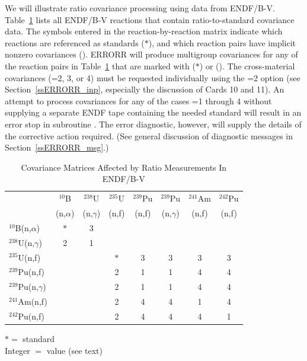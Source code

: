 We will illustrate ratio covariance processing using data from ENDF/B-V.
Table~\ref{ratios} lists all ENDF/B-V reactions that contain ratio-to-standard
covariance data.  The symbols entered in the reaction-by-reaction
matrix indicate which reactions are referenced as standards ($\ast$),
and which reaction pairs have implicit nonzero covariances
().  ERRORR will produce multigroup covariances for any of
the reaction pairs in Table~\ref{ratios} that are marked with ($\ast$) or
().  The cross-material covariances (=2, 3, or 4)
must be requested individually using the
=2 option (see Section~\ref{ssERRORR_inp}, especially
the discussion of
Cards 10 and 11).  An attempt to process covariances for any of the
cases =1 through 4 without supplying a separate ENDF
tape containing the needed standard will result in an error stop in
subroutine .  The error diagnostic, however, will supply
the details of the corrective action required.  (See general discussion
of diagnostic messages in Section~\ref{ssERRORR_msg}.)

\begin{table}
\caption{Covariance Matrices Affected by Ratio
 Measurements In ENDF/B-V}
\label{ratios}
\setlength{\extrarowheight}{1pt}
\begin{center}
\begin{tabular}{lccccccc}
\hline
    & $^{10}$B & $^{238}$U & $^{235}$U & $^{239}$Pu & $^{239}$Pu
        & $^{241}$Am & $^{242}$Pu \\
  & (n,$\alpha$) & (n,$\gamma$) & (n,f) & (n,f) & (n,$\gamma$)
      & (n,f) & (n,f) \\ \hline
$^{10}$B(n,$\alpha$) & $\ast$ & 3 \\
$^{238}$U(n,$\gamma$) & 2 & 1 \\
$^{235}$U(n,f) &   &   & $\ast$ & 3 & 3 & 3 & 3 \\
$^{239}$Pu(n,f) &  &  & 2 & 1 & 1 & 4 & 4 \\
$^{239}$Pu(n,$\gamma$) &  &  & 2 & 1 & 1 & 4 & 4 \\
$^{241}$Am(n,f) &  &  & 2 & 4 & 4 & 1 & 4 \\
$^{242}$Pu(n,f) &  &  & 2 & 4 & 4 & 4 & 1 \\  \hline
\end{tabular}
\end{center}
\hspace{10mm}
\begin{minipage}{3in}
$\ast = $ standard \\
Integer $=$  value (see text)
\end{minipage}
\end{table}

